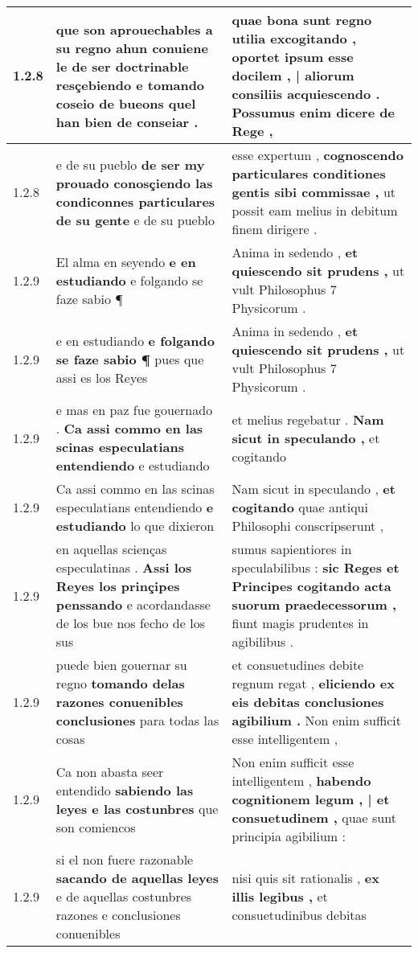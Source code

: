 \begin{tabular}{|p{1cm}|p{6.5cm}|p{6.5cm}|}
1.2.8 & que son aprouechables a su regno \textbf{ ahun conuiene le de ser doctrinable resçebiendo e tomando coseio de bueons } quel han bien de conseiar . & quae bona sunt regno utilia excogitando , \textbf{ oportet ipsum esse docilem , | aliorum consiliis acquiescendo . } Possumus enim dicere de Rege , \\\hline
1.2.8 & e de su pueblo \textbf{ de ser my prouado conosçiendo las condiconnes particulares de su gente } e de su pueblo & esse expertum , \textbf{ cognoscendo particulares conditiones gentis sibi commissae , } ut possit eam melius in debitum finem dirigere . \\\hline
1.2.9 & El alma en seyendo \textbf{ e en estudiando } e folgando se faze sabio ¶ & Anima in sedendo , \textbf{ et quiescendo sit prudens , } ut vult Philosophus 7 Physicorum . \\\hline
1.2.9 & e en estudiando \textbf{ e folgando se faze sabio ¶ } pues que assi es los Reyes & Anima in sedendo , \textbf{ et quiescendo sit prudens , } ut vult Philosophus 7 Physicorum . \\\hline
1.2.9 & e mas en paz fue gouernado . \textbf{ Ca assi commo en las scinas especulatians entendiendo } e estudiando & et melius regebatur . \textbf{ Nam sicut in speculando , } et cogitando \\\hline
1.2.9 & Ca assi commo en las scinas especulatians entendiendo \textbf{ e estudiando } lo que dixieron & Nam sicut in speculando , \textbf{ et cogitando } quae antiqui Philosophi conscripserunt , \\\hline
1.2.9 & en aquellas scienças especulatinas . \textbf{ Assi los Reyes los prinçipes penssando } e acordandasse de los bue nos fecho de los sus & sumus sapientiores in speculabilibus : \textbf{ sic Reges et Principes cogitando acta suorum praedecessorum , } fiunt magis prudentes in agibilibus . \\\hline
1.2.9 & puede bien gouernar su regno \textbf{ tomando delas razones conuenibles conclusiones } para todas las cosas & et consuetudines debite regnum regat , \textbf{ eliciendo ex eis debitas conclusiones agibilium . } Non enim sufficit esse intelligentem , \\\hline
1.2.9 & Ca non abasta seer entendido \textbf{ sabiendo las leyes e las costunbres } que son comiencos & Non enim sufficit esse intelligentem , \textbf{ habendo cognitionem legum , | et consuetudinem , } quae sunt principia agibilium : \\\hline
1.2.9 & si el non fuere razonable \textbf{ sacando de aquellas leyes } e de aquellas costunbres razones e conclusiones conuenibles & nisi quis sit rationalis , \textbf{ ex illis legibus , } et consuetudinibus debitas \\\hline

\end{tabular}
